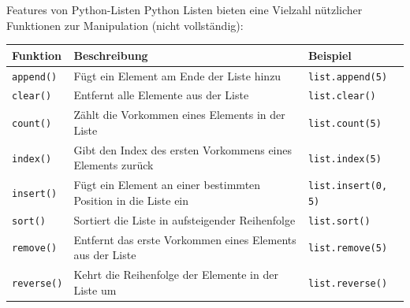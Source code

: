 \documentclass[xelatex,aspectratio=169]{beamer}
\begin{document}
\begin{frame}{Features von Python-Listen}
  Python Listen bieten eine Vielzahl nützlicher Funktionen zur Manipulation (nicht vollständig):
  \begin{tabularx}{\textwidth}{lXl}
    \toprule
    \textbf{Funktion}  & \textbf{Beschreibung}                                          & \textbf{Beispiel}          \\
    \midrule
    \texttt{append()}  & Fügt ein Element am Ende der Liste hinzu                       & \texttt{list.append(5)}    \\
    \texttt{clear()}   & Entfernt alle Elemente aus der Liste                           & \texttt{list.clear()}      \\
    \texttt{count()}   & Zählt die Vorkommen eines Elements in der Liste                & \texttt{list.count(5)}     \\
    \texttt{index()}   & Gibt den Index des ersten Vorkommens eines Elements zurück     & \texttt{list.index(5)}     \\
    \texttt{insert()}  & Fügt ein Element an einer bestimmten Position in die Liste ein & \texttt{list.insert(0, 5)} \\
    \texttt{sort()}    & Sortiert die Liste in aufsteigender Reihenfolge                & \texttt{list.sort()}       \\
    \texttt{remove()}  & Entfernt das erste Vorkommen eines Elements aus der Liste      & \texttt{list.remove(5)}    \\
    \texttt{reverse()} & Kehrt die Reihenfolge der Elemente in der Liste um             & \texttt{list.reverse()}    \\
    \bottomrule
  \end{tabularx}
\end{frame}
\end{document}
